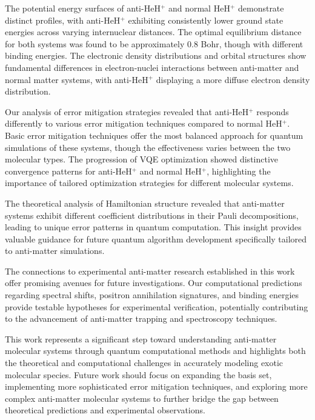 \documentclass[10pt,twocolumn,a4paper]{article}
\begin{document}
The potential energy surfaces of anti-HeH$^+$ and normal HeH$^+$ demonstrate distinct profiles, with anti-HeH$^+$ exhibiting consistently lower ground state energies across varying internuclear distances. The optimal equilibrium distance for both systems was found to be approximately 0.8 Bohr, though with different binding energies. The electronic density distributions and orbital structures show fundamental differences in electron-nuclei interactions between anti-matter and normal matter systems, with anti-HeH$^+$ displaying a more diffuse electron density distribution.

Our analysis of error mitigation strategies revealed that anti-HeH$^+$ responds differently to various error mitigation techniques compared to normal HeH$^+$. Basic error mitigation techniques offer the most balanced approach for quantum simulations of these systems, though the effectiveness varies between the two molecular types. The progression of VQE optimization showed distinctive convergence patterns for anti-HeH$^+$ and normal HeH$^+$, highlighting the importance of tailored optimization strategies for different molecular systems.

The theoretical analysis of Hamiltonian structure revealed that anti-matter systems exhibit different coefficient distributions in their Pauli decompositions, leading to unique error patterns in quantum computation. This insight provides valuable guidance for future quantum algorithm development specifically tailored to anti-matter simulations.

The connections to experimental anti-matter research established in this work offer promising avenues for future investigations. Our computational predictions regarding spectral shifts, positron annihilation signatures, and binding energies provide testable hypotheses for experimental verification, potentially contributing to the advancement of anti-matter trapping and spectroscopy techniques.

This work represents a significant step toward understanding anti-matter molecular systems through quantum computational methods and highlights both the theoretical and computational challenges in accurately modeling exotic molecular species. Future work should focus on expanding the basis set, implementing more sophisticated error mitigation techniques, and exploring more complex anti-matter molecular systems to further bridge the gap between theoretical predictions and experimental observations.
\end{document}
